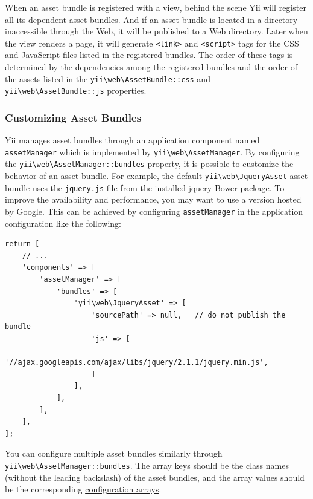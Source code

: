 When an asset bundle is registered with a view, behind the scene Yii will register all its dependent asset bundles.
And if an asset bundle is located in a directory inaccessible through the Web, it will be published to a Web directory.
Later when the view renders a page, it will generate \lstinline|<link>| and \lstinline|<script>| tags for the CSS and JavaScript files
listed in the registered bundles. The order of these tags is determined by the dependencies among
the registered bundles and the order of the assets listed in the \texttt{yii{\allowbreak{}\textbackslash}web{\allowbreak{}\textbackslash}AssetBundle\allowbreak{}::\allowbreak{}css} and \texttt{yii{\allowbreak{}\textbackslash}web{\allowbreak{}\textbackslash}AssetBundle\allowbreak{}::\allowbreak{}js}
properties.

\subsubsection{Customizing Asset Bundles \label{structure-assets.md::customizing-asset-bundles}}
Yii manages asset bundles through an application component named \lstinline|assetManager| which is implemented by \texttt{yii{\allowbreak{}\textbackslash}web{\allowbreak{}\textbackslash}AssetManager}.
By configuring the \texttt{yii{\allowbreak{}\textbackslash}web{\allowbreak{}\textbackslash}AssetManager\allowbreak{}::\allowbreak{}bundles} property, it is possible to customize the behavior of an asset bundle.
For example, the default \texttt{yii{\allowbreak{}\textbackslash}web{\allowbreak{}\textbackslash}JqueryAsset} asset bundle uses the \lstinline|jquery.js| file from the installed
jquery Bower package. To improve the availability and performance, you may want to use a version hosted by Google.
This can be achieved by configuring \lstinline|assetManager| in the application configuration like the following:

\lstset{language=php}\begin{lstlisting}
return [
    // ...
    'components' => [
        'assetManager' => [
            'bundles' => [
                'yii\web\JqueryAsset' => [
                    'sourcePath' => null,   // do not publish the bundle
                    'js' => [
                        '//ajax.googleapis.com/ajax/libs/jquery/2.1.1/jquery.min.js',
                    ]
                ],
            ],
        ],
    ],
];
\end{lstlisting}
You can configure multiple asset bundles similarly through \texttt{yii{\allowbreak{}\textbackslash}web{\allowbreak{}\textbackslash}AssetManager\allowbreak{}::\allowbreak{}bundles}. The array keys
should be the class names (without the leading backslash) of the asset bundles, and the array values should
be the corresponding \hyperref[concept-configurations.md]{configuration arrays}.

